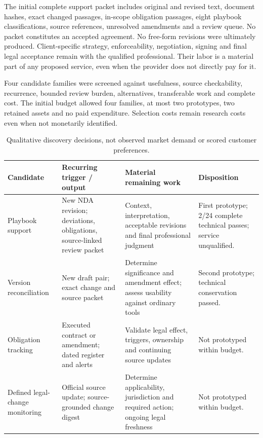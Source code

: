 \documentclass[10pt,a4paper]{article}
\begin{document}
The initial complete support packet includes original and revised text, document hashes, exact changed passages, in-scope obligation passages, eight playbook classifications, source references, unresolved amendments and a review queue. No packet constitutes an accepted agreement. No free-form revisions were ultimately produced. Client-specific strategy, enforceability, negotiation, signing and final legal acceptance remain with the qualified professional. Their labor is a material part of any proposed service, even when the provider does not directly pay for it.

Four candidate families were screened against usefulness, source checkability, recurrence, bounded review burden, alternatives, transferable work and complete cost. The initial budget allowed four families, at most two prototypes, two retained assets and no paid expenditure. Selection costs remain research costs even when not monetarily identified.

\begin{table}[H]\small
\begin{tabularx}{\textwidth}{@{}p{}YYY@{}}\toprule
\textbf{Candidate} & \textbf{Recurring trigger / output} & \textbf{Material remaining work} & \textbf{Disposition}\\\midrule
Playbook support & New NDA revision; deviations, obligations, source-linked review packet & Context, interpretation, acceptable revisions and final professional judgment & First prototype; 2/24 complete technical passes; service unqualified.\\
Version reconciliation & New draft pair; exact change and source packet & Determine significance and amendment effect; assess usability against ordinary tools & Second prototype; technical conservation passed.\\
Obligation tracking & Executed contract or amendment; dated register and alerts & Validate legal effect, triggers, ownership and continuing source updates & Not prototyped within budget.\\
Defined legal-change monitoring & Official source update; source-grounded change digest & Determine applicability, jurisdiction and required action; ongoing legal freshness & Not prototyped within budget.\\\bottomrule
\end{tabularx}
\caption{Qualitative discovery decisions, not observed market demand or scored customer preferences.}
\end{table}
\end{document}
